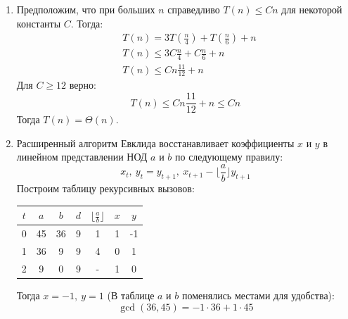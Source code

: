 \documentclass{article}
\begin{document}
\begin{enumerate}
          Оценим асимптотику алгоритма для $a$ и $b$ с
          количеством битов $n$ и $m$ соответственно.
          Асимптотически количество вызовов алгоритма
          Евклида равно
          \[
              O(\log \min(a, b)) = O(\min(n, m)) = O(m)
          \]
          так как на каждом шаге алгоритма Евклида одно из чисел
          уменьшается как минимум вдвое.
          Таким образом, асимптотика алгоритма алгоритма
          Евклида равна $O(nm^2)$, так как на каждом шаге
          алгоритма Евклида происходит деление с остатком
          за $O(nm)$.

          Тогда асимптотика алгоритма нахождения НОК равна
          $O(nm + nm^2 + m(n + m)) = O(nm^2)$, где произведение
          и требует $O(nm)$ времени,
          деление --- $O(m(n + m))$,
          сравнение --- линейное.

    \item
          Предположим, что при больших $n$ справедливо
          $T(n) \leq Cn$ для некоторой константы $C$.
          Тогда:
          \begin{align*}
               & T(n) = 3T(\frac{n}{4}) + T(\frac{n}{6}) + n \\
               & T(n) \leq 3C\frac{n}{4} + C\frac{n}{6} + n  \\
               & T(n) \leq Cn\frac{11}{12} + n
          \end{align*}
          Для $C \geq 12$ верно:
          \[
              T(n) \leq Cn\frac{11}{12} + n \leq Cn
          \]
          Тогда $T(n) = \Theta(n)$.

    \item
          Расширенный алгоритм Евклида восстанавливает
          коэффициенты $x$ и $y$ в линейном представлении
          НОД $a$ и $b$ по следующему правилу:
          \[
              x_t, \ y_t = y_{t+1}, \ x_{t+1} -
              \lfloor \frac{a}{b} \rfloor y_{t+1}
          \]
          Построим таблицу рекурсивных вызовов:
          \begin{center}
              \begin{tabular}{|c|c|c|c|c|c|c|}
                  \hline
                  $t$ & $a$ & $b$ & $d$ & $\lfloor \frac{a}{b} \rfloor$ & $x$ & $y$ \\
                  \hline
                  \hline
                  0   & 45  & 36  & 9   & 1                             & 1   & -1  \\
                  \hline
                  1   & 36  & 9   & 9   & 4                             & 0   & 1   \\
                  \hline
                  2   & 9   & 0   & 9   & -                             & 1   & 0   \\
                  \hline
              \end{tabular}
          \end{center}
          Тогда $x = -1, \ y = 1$ (В таблице $a$ и $b$
          поменялись местами для удобства):
          \[
              \gcd(36, 45) = -1 \cdot 36 + 1 \cdot 45
          \]


\end{enumerate}
\end{document}

